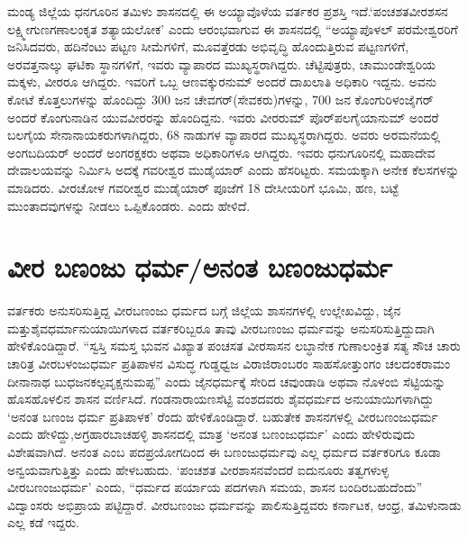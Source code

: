 ಮಂಡ್ಯ ಜಿಲ್ಲೆಯ ಧನಗೂರಿನ ತಮಿಳು ಶಾಸನದಲ್ಲಿ ಈ ಅಯ್ಯಾವೊಳೆಯ ವರ್ತಕರ ಪ್ರಶಸ್ತಿ ಇದೆ.\break ‘ಪಂಚಶತವೀರಶಸನ ಲಕ್ಷ್ಮೀಗುಣಗಣಾಲಂಕೃತ ಶತ್ಯಾಯಲೋಕ’ ಎಂದು ಆರಂಭವಾಗುವ ಈ ಶಾಸನದಲ್ಲಿ “ಅಯ್ಯಾಪೊಳಲ್​ ಪರಮೇಶ್ವರರಿಗೆ ಜನಿಸಿದವರು, ಹದಿನೆಂಟು ಪಟ್ಟಣ ಸೀಮೆಗಳಿಗೆ, ಮೂವತ್ತೆರಡು ಅಭಿವೃದ್ಧಿ ಹೊಂದುತ್ತಿರುವ ಪಟ್ಟಣಗಳಿಗೆ, ಅರವತ್ತನಾಲ್ಕು ಘಟಿಕಾ ಸ್ಥಾನಗಳಿಗೆ, ಇವರು ವ್ಯಾಪಾರದ ಮುಖ್ಯಸ್ಥರಾಗಿದ್ದರು. ಚೆಟ್ಟಿಪುತ್ರರು, ಚಾಮುಂಡೇಶ್ವರಿಯ ಮಕ್ಕಳು, ವೀರರೂ ಆಗಿದ್ದರು. ಇವರಿಗೆ ಒಬ್ಬ ಆಣವಕ್ಕುರನುಮ್ ಅಂದರೆ ದಾಖಲಾತಿ ಅಧಿಕಾರಿ ಇದ್ದನು. ಅವನು ಕೋಟೆ ಕೊತ್ತಲುಗಳನ್ನು ಹೊಂದಿದ್ದು 300 ಜನ ಚೇವಗರ್​(ಸೇವಕರು)ಗಳನ್ನು, 700 ಜನ ಕೊಂಗುರಿಳಂಜೈಗರ್​ ಅಂದರೆ ಕೊಂಗುನಾಡಿನ ಯುವವೀರರನ್ನು ಹೊಂದಿದ್ದನು. ಇವರು ವೀರರುಮ್ ಪೊರ್​ಪಲಗೈಯಾನುಮ್ ಅಂದರೆ ಬಲಗೈಯ ಸೇನಾನಾಯಕರುಗಳಾಗಿದ್ದರು, 68 ನಾಡುಗಳ ವ್ಯಾಪಾರದ ಮುಖ್ಯಸ್ಥರಾಗಿದ್ದರು. ಅವರು ಅರಮನೆಯಲ್ಲಿ ಅಂಗಬದಿಯರ್​ ಅಂದರೆ ಅಂಗರಕ್ಷಕರು ಅಥವಾ ಅಧಿಕಾರಿಗಳೂ ಆಗಿದ್ದರು. ಇವರು ಧನುಗೂರಿನಲ್ಲಿ ಮಹಾದೇವ ದೇವಾಲಯವನ್ನು ನಿರ್ಮಿಸಿ ಅದಕ್ಕೆ ಗವರೀಶ್ವರ ಮುಡೈಯಾರ್​ ಎಂದು ಹೆಸರಿಟ್ಟರು. ಸಮಯಕ್ಕಾಗಿ ಅನೇಕ ಕೆಲಸಗಳನ್ನು ಮಾಡಿದರು. ವೀರಚೋಳ ಗವರೀಶ್ವರ ಮುಡೈಯಾರ್​ ಪೂಜೆಗೆ 18 ದೇಸೀಯರಿಗೆ ಭೂಮಿ, ಹಣ, ಬಟ್ಟೆ ಮುಂತಾದವುಗಳನ್ನು ನೀಡಲು ಒಪ್ಪಿಕೊಂಡರು. ಎಂದು ಹೇಳಿದೆ.


\section{ವೀರ ಬಣಂಜು ಧರ್ಮ/ಅನಂತ ಬಣಂಜುಧರ್ಮ}

ವರ್ತಕರು ಅನುಸರಿಸುತ್ತಿದ್ದ ವೀರಬಣಂಜು ಧರ್ಮದ ಬಗ್ಗೆ ಜಿಲ್ಲೆಯ ಶಾಸನಗಳಲ್ಲಿ ಉಲ್ಲೇಖವಿದ್ದು, ಜೈನ ಮತ್ತು\break ಶೈವಧರ್ಮಾನುಯಾಯಿಗಳಾದ ವರ್ತಕರಿಬ್ಬರೂ ತಾವು ವೀರಬಣಂಜು ಧರ್ಮವನ್ನು ಅನುಸರಿಸುತ್ತಿದ್ದುದಾಗಿ ಹೇಳಿಕೊಂಡಿದ್ದಾರೆ. “ಸ್ವಸ್ತಿ ಸಮಸ್ತ ಭುವನ ವಿಖ್ಯಾತ ಪಂಚಸತ ವೀರಸಾಸನ ಲಬ್ಧಾನೇಕ ಗುಣಾಲಂಕ್ರಿತ ಸತ್ಯ ಸೌಚ ಚಾರು ಚಾರಿತ್ರ ವೀರಬಳಂಜುಧರ್ಮ ಪ್ರತಿಪಾಳನ ವಿಸುದ್ಧ ಗುಡ್ಡಧ್ವಜ ವಿರಾಜಿರಾಂಬರಂ ಸಾಹಸೋತ್ತುಂಗಂ ಚಲದಂಕರಾಮಂ ದೀನಾನಾಥ ಬುಧಜನ\break ಕಲ್ಪವೃಕ್ಷನುಮಪ್ಪ” ಎಂದು ಜೈನಧರ್ಮಕ್ಕೆ ಸೇರಿದ ಚವುಂಡಾಡಿ ಅಥವಾ ನೊಳಂಬಿ ಸೆಟ್ಟಿಯನ್ನು ಹೊಸಹೊಳಲಿನ ಶಾಸನ ವರ್ಣಿಸಿದೆ. ಗಂಡನಾರಾಯಣಸೆಟ್ಟಿ ವಂಶದವರು ಶೈವಧರ್ಮದ ಅನುಯಾಯಿಗಳಾಗಿದ್ದು ‘ಅನಂತ ಬಣಂಜ ಧರ್ಮ ಪ್ರತಿಪಾಳಕ’ ರೆಂದು ಹೇಳಿಕೊಂಡಿದ್ದಾರೆ. ಬಹುತೇಕ ಶಾಸನಗಳಲ್ಲಿ ವೀರಬಣಂಜುಧರ್ಮ ಎಂದು ಹೇಳಿದ್ದು,\break ಅಗ್ರಹಾರಬಾಚಹಳ್ಳಿ ಶಾಸನದಲ್ಲಿ ಮಾತ್ರ ‘ಅನಂತ ಬಣಂಜುಧರ್ಮ’ ಎಂದು ಹೇಳಿರುವುದು ವಿಶೇಷವಾಗಿದೆ. ಅನಂತ ಎಂಬ ಪದಪ್ರಯೋಗದಿಂದ ಈ ಬಣಂಜುಧರ್ಮವು ಎಲ್ಲ ಧರ್ಮದ ವರ್ತಕರಿಗೂ ಕೂಡಾ ಅನ್ವಯವಾಗುತ್ತಿತ್ತು ಎಂದು ಹೇಳಬಹುದು. ‘ಪಂಚಶತ ವೀರಶಾಸನವೆಂದರೆ ಐದುನೂರು ತತ್ವಗಳುಳ್ಳ ವೀರಬಣಂಜುಧರ್ಮ’ ಎಂದು, “ಧರ್ಮದ ಪರ್ಯಾಯ ಪದಗಳಾಗಿ ಸಮಯ, ಶಾಸನ ಬಂದಿರಬಹುದೆಂದು” ವಿದ್ವಾಂಸರು ಅಭಿಪ್ರಾಯ ಪಟ್ಟಿದ್ದಾರೆ. ವೀರಬಣಂಜು ಧರ್ಮವನ್ನು ಪಾಲಿಸುತ್ತಿದ್ದವರು ಕರ್ನಾಟಕ, ಆಂಧ್ರ, ತಮಿಳುನಾಡು ಎಲ್ಲ ಕಡೆ ಇದ್ದರು.


